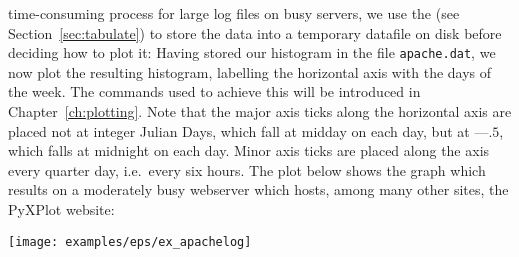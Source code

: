 {time-consuming process for large log files on busy servers, we use the
 (see Section~\ref{sec:tabulate}) to store the data into a
temporary datafile on disk before deciding how to plot it:
\nlscf
{}\newline
{}\newline
{}\newline
{}
\nlscf
Having stored our histogram in the file {\tt apache.dat}, we
now plot the resulting histogram, labelling the horizontal axis with the days
of the week.  The commands used to achieve this will be introduced in
Chapter~\ref{ch:plotting}. Note that the major axis ticks along the horizontal
axis are placed not at integer Julian Days, which fall at midday on each day,
but at ---$.5$, which falls at midnight on each day. Minor axis ticks are
placed along the axis every quarter day, i.e.\ every six hours.
\nlscf
{}\newline
{}\newline
{}\newline
{}\newline
{}\newline
{}
\nlscf
The plot below shows the graph which results on a moderately busy webserver
which hosts, among many other sites, the PyXPlot website:
\nlscf
\centerline{\texttt{[image: examples/eps/ex\_apachelog]}}
}

